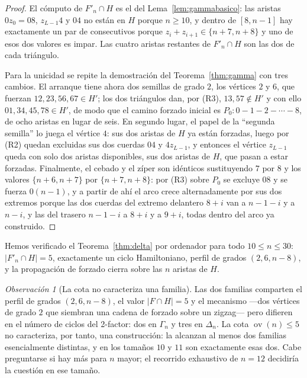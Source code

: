 \documentclass[11pt,a4paper]{article}
\theoremstyle{definition}
\theoremstyle{remark}
\newtheorem{observacion}[teorema]{Observación}
\newcommand{\ov}{\operatorname{ov}}
\begin{document}
\begin{proof}
El cómputo de $F'_n\cap H$ es el del Lema~\ref{lem:gammabasico}: las aristas $0z_0=08$, $z_{L-1}4$ y $04$ no están en $H$ porque $n\ge10$, y dentro de $[8,n-1]$ hay exactamente un par de consecutivos porque $z_i+z_{i+1}\in\{n+7,n+8\}$ y uno de esos dos valores es impar. Las cuatro aristas restantes de $F'_n\cap H$ son las dos de cada triángulo.

Para la unicidad se repite la demostración del Teorema~\ref{thm:gamma} con tres cambios. El arranque tiene ahora dos semillas de grado $2$, los vértices $2$ y $6$, que fuerzan $12,23,56,67\in H'$; los dos triángulos dan, por (R3), $13,57\notin H'$ y con ello $01,34,45,78\in H'$, de modo que el camino forzado inicial es $P_0:0-1-2-\cdots-8$, de ocho aristas en lugar de seis. En segundo lugar, el papel de la ``segunda semilla'' lo juega el vértice $4$: sus dos aristas de $H$ ya están forzadas, luego por (R2) quedan excluidas sus dos cuerdas $04$ y $4z_{L-1}$, y entonces el vértice $z_{L-1}$ queda con solo dos aristas disponibles, sus dos aristas de $H$, que pasan a estar forzadas. Finalmente, el cebado y el zíper son idénticos sustituyendo $7$ por $8$ y los valores $\{n+6,n+7\}$ por $\{n+7,n+8\}$: por (R3) sobre $P_0$ se excluye $08$ y se fuerza $0(n{-}1)$, y a partir de ahí el arco crece alternadamente por sus dos extremos porque las dos cuerdas del extremo delantero $8+i$ van a $n-1-i$ y a $n-i$, y las del trasero $n-1-i$ a $8+i$ y a $9+i$, todas dentro del arco ya construido.
\end{proof}

Hemos verificado el Teorema~\ref{thm:delta} por ordenador para todo $10\le n\le30$: $|F'_n\cap H|=5$, exactamente un ciclo Hamiltoniano, perfil de grados $(2,6,n-8)$, y la propagación de forzado cierra sobre las $n$ aristas de $H$.

\begin{observacion}[La cota no caracteriza una familia]\label{obs:dos}
Las dos familias comparten el perfil de grados $(2,6,n-8)$, el valor $|F\cap H|=5$ y el mecanismo —dos vértices de grado $2$ que siembran una cadena de forzado sobre un zigzag— pero difieren en el número de ciclos del 2-factor: dos en $\Gamma_n$ y tres en $\Delta_n$. La cota $\ov(n)\le5$ no caracteriza, por tanto, una construcción: la alcanzan al menos dos familias esencialmente distintas, y en los tamaños $10$ y $11$ son exactamente esas dos. Cabe preguntarse si hay más para $n$ mayor; el recorrido exhaustivo de $n=12$ decidiría la cuestión en ese tamaño.
\end{observacion}
\end{document}
